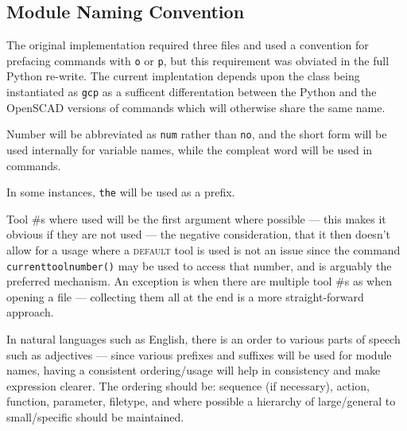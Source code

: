 \documentclass{ltxdoc}
\begin{document}
\subsection{Module Naming Convention}

The original implementation required three files and used a convention for prefacing commands with \verb|o| or \verb|p|, but this requirement was obviated in the full Python re-write. The current implentation depends upon the class being instantiated as \verb|gcp| as a sufficent differentation between the Python and the OpenSCAD versions of commands which will otherwise share the same name.


Number will be abbreviated as \verb|num| rather than \verb|no|, and the short form will be used internally for variable names, while the compleat word will be used in commands.

In some instances, \verb|the| will be used as a prefix.

Tool \#s where used will be the first argument where possible --- this makes it obvious if they are not used --- the negative consideration, that it then doesn't allow for a usage where a \textsc{default} tool is used is not an issue since the command \verb|currenttoolnumber()| may be used to access that number, and is arguably the preferred mechanism. An exception is when there are multiple tool \#s as when opening a file --- collecting them all at the end is a more straight-forward approach.

In natural languages such as English, there is an order to various parts of speech such as adjectives 
--- since various prefixes and suffixes will be used for module names, having a consistent ordering/usage will help in consistency and make expression clearer. The ordering should be: sequence (if necessary), action, function, parameter, filetype, and where possible a hierarchy of large/general to small/specific should be maintained.
\end{document}
